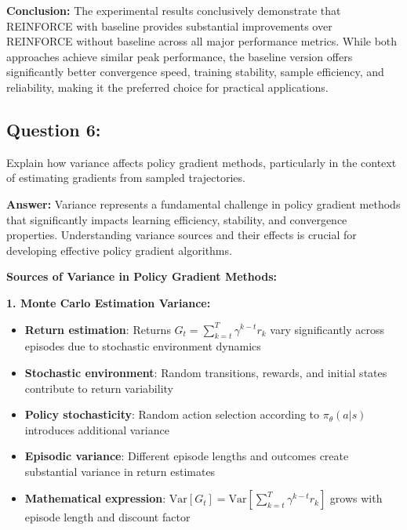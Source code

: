 \documentclass[12pt]{article}
\begin{document}
{{{\textbf{Conclusion:}
The experimental results conclusively demonstrate that REINFORCE with baseline provides substantial improvements over REINFORCE without baseline across all major performance metrics. While both approaches achieve similar peak performance, the baseline version offers significantly better convergence speed, training stability, sample efficiency, and reliability, making it the preferred choice for practical applications.

\subsection{Question 6:}

Explain how variance affects policy gradient methods, particularly in the context of estimating gradients from sampled trajectories.
\vspace*{0.3cm}

\textbf{Answer:} Variance represents a fundamental challenge in policy gradient methods that significantly impacts learning efficiency, stability, and convergence properties. Understanding variance sources and their effects is crucial for developing effective policy gradient algorithms.

\textbf{Sources of Variance in Policy Gradient Methods:}

\textbf{1. Monte Carlo Estimation Variance:}
\begin{itemize}
    \item \textbf{Return estimation}: Returns $G_t = \sum_{k=t}^{T} \gamma^{k-t} r_k$ vary significantly across episodes due to stochastic environment dynamics
    \item \textbf{Stochastic environment}: Random transitions, rewards, and initial states contribute to return variability
    \item \textbf{Policy stochasticity}: Random action selection according to $\pi_\theta(a|s)$ introduces additional variance
    \item \textbf{Episodic variance}: Different episode lengths and outcomes create substantial variance in return estimates
    \item \textbf{Mathematical expression}: $\text{Var}[G_t] = \text{Var}[\sum_{k=t}^{T} \gamma^{k-t} r_k]$ grows with episode length and discount factor
\end{itemize}

}}}
\end{document}
